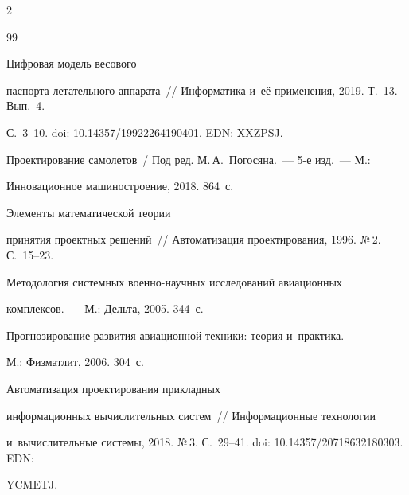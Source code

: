 \begin{multicols}{2}
{{\begin{thebibliography}{99}


 Циф\-ро\-вая модель весового 


паспорта летательного аппарата~// Информатика и~её применения, 2019. Т.~13. Вып.~4.  


С.~3--10. doi: 10.14357/19922264190401. EDN: XXZPSJ.




Проектирование самолетов~/ Под ред. М.\,А.~Погосяна.~--- 5-е изд.~--- М.: 


Инновационное машиностроение, 2018. 864~с.




 Элементы математической теории 


принятия проектных решений~// Автоматизация проектирования, 1996. №\,2. С.~15--23.




 Методология системных военно-на\-уч\-ных исследований авиационных 


комплексов.~--- М.: Дельта, 2005. 344~с.




 Прогнозирование развития авиационной техники: теория и~практика.~--- 


М.: Физматлит, 2006. 304~с.




 Автоматизация проектирования прикладных 


информационных вы\-чис\-ли\-тель\-ных сис\-тем~// Информационные технологии 


и~вычислительные сис\-те\-мы, 2018. №\,3. С.~29--41. doi: 10.14357/20718632180303. EDN: 


YCMETJ.


\end{thebibliography}





 }


 }





\end{multicols}





\vspace*{-9pt}





